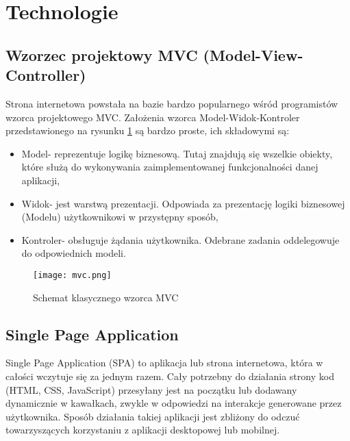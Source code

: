 \section{Technologie}
\subsection{Wzorzec projektowy MVC (Model-View-Controller)}
Strona internetowa powstała na bazie bardzo popularnego wśród programistów wzorca projektowego MVC. Założenia wzorca Model-Widok-Kontroler przedstawionego na rysunku \ref{fig:schemat_mvc} są bardzo proste, ich składowymi są:
\begin{itemize}
\item Model- reprezentuje logikę biznesową. Tutaj znajdują się wszelkie obiekty, które służą do wykonywania zaimplementowanej funkcjonalności danej aplikacji,
\item Widok- jest warstwą prezentacji. Odpowiada za prezentację logiki biznesowej (Modelu) użytkownikowi w przystępny sposób,
\item Kontroler- obsługuje żądania użytkownika. Odebrane zadania oddelegowuje do odpowiednich modeli.
\end{itemize}
\begin{figure}[H]
	\centering
	\texttt{[image: mvc.png]}
	\caption{Schemat klasycznego wzorca MVC}
	\label{fig:schemat_mvc}
\end{figure}

\subsection{Single Page Application}
Single Page Application (SPA) to aplikacja lub strona internetowa, która w całości wczytuje się za jednym razem. Cały potrzebny do działania strony kod (HTML, CSS, JavaScript) przesyłany jest na początku lub dodawany dynamicznie w kawałkach, zwykle w odpowiedzi na interakcje generowane przez użytkownika.
Sposób działania takiej aplikacji jest zbliżony do odczuć towarzyszących korzystaniu z aplikacji desktopowej lub mobilnej.

